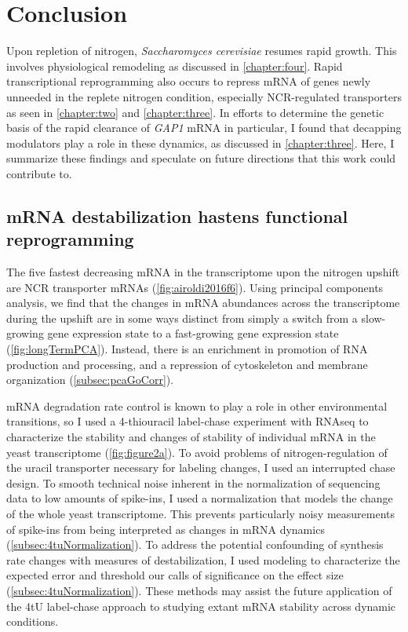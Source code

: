 \chapter{Conclusion}
\label{chapter:five}


Upon repletion of nitrogen, \textit{Saccharomyces cerevisiae} 
resumes rapid growth.
This involves physiological remodeling as discussed in
\autoref{chapter:four}.
Rapid transcriptional reprogramming also occurs to repress mRNA of 
genes newly unneeded in the replete nitrogen condition, especially
NCR-regulated transporters as seen in \autoref{chapter:two} and
\autoref{chapter:three}.
In efforts to determine the genetic basis of the rapid clearance of
\textit{GAP1} mRNA in particular, I found that decapping modulators
play a role in these dynamics, as discussed in \autoref{chapter:three}. 
Here, I summarize these findings and speculate on future
directions that this work could contribute to.

\section{mRNA destabilization hastens functional reprogramming}

The five fastest decreasing mRNA in the transcriptome upon the
nitrogen upshift are NCR transporter mRNAs
(\autoref{fig:airoldi2016f6}).
Using principal components analysis, 
we find that the changes in mRNA abundances across the transcriptome
during the upshift are in some ways distinct from simply a switch
from a slow-growing gene expression state to a fast-growing gene
expression state (\autoref{fig:longTermPCA}).
Instead, there is an enrichment in promotion of RNA production and
processing, and a repression of cytoskeleton and membrane
organization (\autoref{subsec:pcaGoCorr}).

mRNA degradation rate control is known to play a role in other
environmental transitions, so I used a 4-thiouracil label-chase
experiment with RNAseq to characterize the stability and changes
of stability of individual mRNA in the yeast transcriptome 
(\autoref{fig:figure2a}).
To avoid problems of nitrogen-regulation of the uracil transporter
necessary for labeling changes, I used an interrupted chase
design.
To smooth technical noise inherent in the normalization of sequencing
data to low amounts of spike-ins, I used a normalization that models
the change of the whole yeast transcriptome.
This prevents particularly noisy measurements of spike-ins from 
being interpreted as changes in mRNA dynamics 
(\autoref{subsec:4tuNormalization}).
To address the potential confounding of synthesis rate changes with
measures of destabilization, I used modeling to characterize the
expected error and threshold our calls of significance on the
effect size (\autoref{subsec:4tuNormalization}).
These methods may assist the future application of the 4tU label-chase
approach to studying extant mRNA stability across dynamic conditions.

